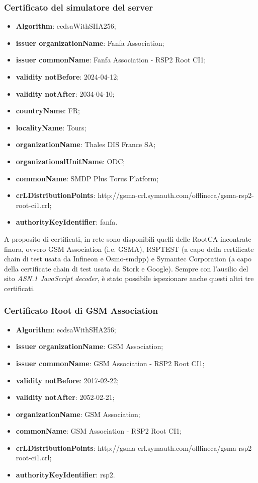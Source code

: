 \documentclass[10pt, oneside]{book}
\begin{document}
\subsubsection{Certificato del simulatore del server}
\begin{itemize}
\item \textbf{Algorithm}: ecdsaWithSHA256;
\item \textbf{issuer organizationName}: Fanfa Association;
\item \textbf{issuer commonName}: Fanfa Association - RSP2 Root CI1;
\item \textbf{validity notBefore}: 2024-04-12;
\item \textbf{validity notAfter}: 2034-04-10;
\item \textbf{countryName}: FR;
\item \textbf{localityName}: Tours;
\item \textbf{organizationName}: Thales DIS France SA;
\item \textbf{organizationalUnitName}: ODC;
\item \textbf{commonName}: SMDP Plus Torus Platform;
\item \textbf{crLDistributionPoints}: http://gsma-crl.symauth.com/offlineca/gsma-rsp2-root-ci1.crl;
\item \textbf{authorityKeyIdentifier}: fanfa.
\end{itemize}

\noindent A proposito di certificati, in rete sono disponibili quelli delle RootCA incontrate finora, ovvero GSM Association (i.e. GSMA), RSPTEST (a capo della certificate chain di test usata da Infineon e Osmo-smdpp) e Symantec Corporation (a capo della certificate chain di test usata da Stork e Google). Sempre con l'ausilio del sito \textit{ASN.1 JavaScript decoder}, è stato possibile ispezionare anche questi altri tre certificati.

\subsubsection{Certificato Root di GSM Association}
\begin{itemize}
\item \textbf{Algorithm}: ecdsaWithSHA256;
\item \textbf{issuer organizationName}: GSM Association;
\item \textbf{issuer commonName}: GSM Association - RSP2 Root CI1;
\item \textbf{validity notBefore}: 2017-02-22;
\item \textbf{validity notAfter}: 2052-02-21;
\item \textbf{organizationName}: GSM Association;
\item \textbf{commonName}: GSM Association - RSP2 Root CI1;
\item \textbf{crLDistributionPoints}: http://gsma-crl.symauth.com/offlineca/gsma-rsp2-root-ci1.crl;
\item \textbf{authorityKeyIdentifier}: rsp2.
\end{itemize}
\end{document}
